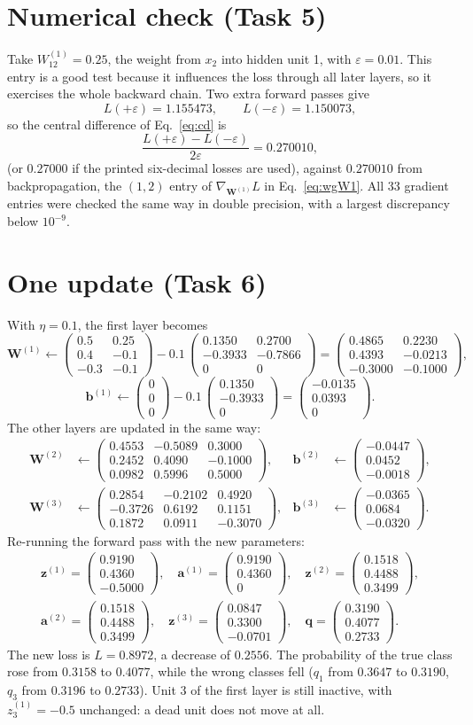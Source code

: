 \documentclass[12pt]{article}
\numberwithin{equation}{section} %
\newcommand{\WOne}{\begin{pmatrix}0.5 & 0.25 \\ 0.4 & -0.1 \\ -0.3 & -0.1\end{pmatrix}}
\newcommand{\bOne}{\begin{pmatrix}0 \\ 0 \\ 0\end{pmatrix}}
\newcommand{\etaVal}{0.1}
\newcommand{\pTrue}{0.3158}
\newcommand{\gWOne}{\begin{pmatrix}0.1350 & 0.2700 \\ -0.3933 & -0.7866 \\ 0 & 0\end{pmatrix}}
\newcommand{\gbOne}{\begin{pmatrix}0.1350 \\ -0.3933 \\ 0\end{pmatrix}}
\newcommand{\epsVal}{0.01}
\newcommand{\Lplus}{1.155473}
\newcommand{\Lminus}{1.150073}
\newcommand{\fdVal}{0.270010}
\newcommand{\bpVal}{0.270010}
\newcommand{\fdRounded}{0.27000}
\newcommand{\WOneNew}{\begin{pmatrix}0.4865 & 0.2230 \\ 0.4393 & -0.0213 \\ -0.3000 & -0.1000\end{pmatrix}}
\newcommand{\bOneNew}{\begin{pmatrix}-0.0135 \\ 0.0393 \\ 0\end{pmatrix}}
\newcommand{\WTwoNew}{\begin{pmatrix}0.4553 & -0.5089 & 0.3000 \\ 0.2452 & 0.4090 & -0.1000 \\ 0.0982 & 0.5996 & 0.5000\end{pmatrix}}
\newcommand{\bTwoNew}{\begin{pmatrix}-0.0447 \\ 0.0452 \\ -0.0018\end{pmatrix}}
\newcommand{\WThreeNew}{\begin{pmatrix}0.2854 & -0.2102 & 0.4920 \\ -0.3726 & 0.6192 & 0.1151 \\ 0.1872 & 0.0911 & -0.3070\end{pmatrix}}
\newcommand{\bThreeNew}{\begin{pmatrix}-0.0365 \\ 0.0684 \\ -0.0320\end{pmatrix}}
\newcommand{\pAfter}{\begin{pmatrix}0.3190 \\ 0.4077 \\ 0.2733\end{pmatrix}}
\newcommand{\pTrueAfter}{0.4077}
\newcommand{\Lone}{0.8972}
\newcommand{\dropAct}{0.2556}
\newcommand{\zOneNew}{\begin{pmatrix}0.9190 \\ 0.4360 \\ -0.5000\end{pmatrix}}
\newcommand{\aOneNew}{\begin{pmatrix}0.9190 \\ 0.4360 \\ 0\end{pmatrix}}
\newcommand{\zTwoNew}{\begin{pmatrix}0.1518 \\ 0.4488 \\ 0.3499\end{pmatrix}}
\newcommand{\aTwoNew}{\begin{pmatrix}0.1518 \\ 0.4488 \\ 0.3499\end{pmatrix}}
\newcommand{\zThreeNew}{\begin{pmatrix}0.0847 \\ 0.3300 \\ -0.0701\end{pmatrix}}
\newcommand{\pOneNew}{0.3190}
\newcommand{\pThreeNew}{0.2733}
\newcommand{\pOneOld}{0.3647}
\newcommand{\pThreeOld}{0.3196}
\newcommand{\vc}[1]{\symbf{#1}}
\newcommand{\grad}[1]{\nabla_{#1}L}
\begin{document}
\section{Numerical check (Task 5)}

Take $W^{(1)}_{12}=0.25$, the weight from $x_2$ into hidden unit 1, with
$\varepsilon=\epsVal$. This entry is a good test because it influences the loss
through all later layers, so it exercises the whole backward chain. Two extra
forward passes give
\begin{equation}\label{eq:wLpm}
  L(+\varepsilon)=\Lplus,\qquad L(-\varepsilon)=\Lminus,
\end{equation}
so the central difference of Eq.~\eqref{eq:cd} is
\begin{equation}\label{eq:wcd}
  \frac{L(+\varepsilon)-L(-\varepsilon)}{2\varepsilon}=\fdVal,
\end{equation}
(or $\fdRounded$ if the printed six-decimal losses are used), against
$\bpVal$ from backpropagation, the $(1,2)$ entry of
$\grad{\vc{W}^{(1)}}$ in Eq.~\eqref{eq:wgW1}. All 33 gradient entries were checked
the same way in double precision, with a largest discrepancy below $10^{-9}$.

\section{One update (Task 6)}

With $\eta=\etaVal$, the first layer becomes
\begin{equation}\label{eq:wup1W}
  \vc{W}^{(1)}\leftarrow\WOne-\etaVal\,\gWOne=\WOneNew,
\end{equation}
\begin{equation}\label{eq:wup1b}
  \vc{b}^{(1)}\leftarrow\bOne-\etaVal\,\gbOne=\bOneNew .
\end{equation}
The other layers are updated in the same way:
\begin{align}
  \vc{W}^{(2)}&\leftarrow\WTwoNew, & \vc{b}^{(2)}&\leftarrow\bTwoNew,\\
  \vc{W}^{(3)}&\leftarrow\WThreeNew, & \vc{b}^{(3)}&\leftarrow\bThreeNew .
\end{align}
Re-running the forward pass with the new parameters:
\begin{gather}
  \vc{z}^{(1)}=\zOneNew,\quad \vc{a}^{(1)}=\aOneNew,\quad \vc{z}^{(2)}=\zTwoNew,\\
  \vc{a}^{(2)}=\aTwoNew,\quad \vc{z}^{(3)}=\zThreeNew,\quad \vc{q}=\pAfter .
\end{gather}
The new loss is $L=\Lone$, a decrease of $\dropAct$. The probability of the true
class rose from $\pTrue$ to $\pTrueAfter$, while the wrong classes fell
($q_1$ from $\pOneOld$ to $\pOneNew$, $q_3$ from $\pThreeOld$ to $\pThreeNew$).
Unit 3 of the first layer is still inactive, with $z^{(1)}_3=-0.5$ unchanged:
a dead unit does not move at all.
\end{document}
